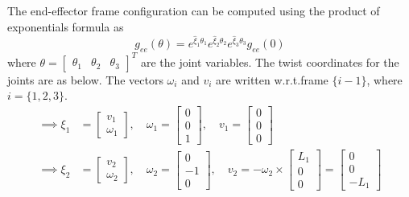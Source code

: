 The end-effector frame configuration can be computed using the product of exponentials formula as
\begin{equation}
    g_{e e}(\theta)
    =
    e^{\widehat{\xi}_{1} \theta_{1}}
    e^{\widehat{\xi}_{2} \theta_{2}}
    e^{\widehat{\xi}_{3} \theta_{3}}
    g_{e e}(0)
\end{equation}
where \( \theta = \begin{bmatrix} \theta_1 & \theta_2 & \theta_3 \end{bmatrix}^T \) are the joint variables.
The twist coordinates for the joints are as below.
The vectors \( \omega_i \) and \( v_i \) are written w.r.t.\@ frame \( \{i-1\} \), where \( i = \{1, 2, 3\} \).
\begin{align*}
    \implies
    \xi_{1}
     & =
    \begin{bmatrix}
        v_1 \\
        \omega_1
    \end{bmatrix},
    \quad
    \omega_1
    =
    \begin{bmatrix}
        0 \\
        0 \\
        1
    \end{bmatrix},
    \quad
    v_1
    =
    \begin{bmatrix}
        0 \\
        0 \\
        0
    \end{bmatrix}
    \\
    \implies
    \xi_{2}
     & =
    \begin{bmatrix}
        v_2 \\
        \omega_2
    \end{bmatrix},
    \quad
    \omega_2
    =
    \begin{bmatrix}
        0  \\
        -1 \\
        0
    \end{bmatrix},
    \quad
    v_2
    =
    - \omega_2 \times
    \begin{bmatrix}
        L_1 \\
        0   \\
        0
    \end{bmatrix}
    =
    \begin{bmatrix}
        0 \\
        0 \\
        -L_1
    \end{bmatrix}
    \\

\end{align*}
